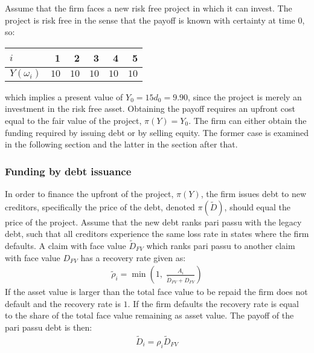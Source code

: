\documentclass[../main.tex]{subfiles}
\begin{document}
        Assume that the firm faces a new risk free project in which it can invest. The project is risk free in the sense that the payoff is known with certainty at time 0, so:
            \begin{table}[H]
                \centering
                \begin{tabular}{l|rrrrr}
                    $i$ & 1 & 2 & 3 & 4 & 5 \\
                    \hline
                    $Y(\omega_{i})$ & $10$ & $10$ & $10$ & $10$ & $10$
                \end{tabular}
            \end{table}
        which implies a present value of $Y_{0} = 15d_{0} = 9.90$, since the project is merely an investment in the risk free asset. Obtaining the payoff requires an upfront cost equal to the fair value of the project, $\pi(Y) = Y_{0}$. The firm can either obtain the funding required by issuing debt or by selling equity. The former case is examined in the following section and the latter in the section after that.

    \subsubsection{Funding by debt issuance}
        In order to finance the upfront of the project, $\pi(Y)$, the firm issues debt to new creditors, specifically the price of the debt, denoted $\pi(\tilde{D})$, should equal the price of the project. Assume that the new debt ranks pari passu with the legacy debt, such that all creditors experience the same loss rate in states where the firm defaults. A claim with face value $\tilde{D}_{FV}$ which ranks pari passu to another claim with face value $D_{FV}$ has a recovery rate given as:
            \begin{align}
                \tilde{\rho}_{i} = \min\left(
                    1,\;
                    \frac{A_{i}}{\tilde{D}_{FV} + D_{FV}}
                \right)
            \end{align}
        If the asset value is larger than the total face value to be repaid the firm does not default and the recovery rate is $1$. If the firm defaults the recovery rate is equal to the share of the total face value remaining as asset value. The payoff of the pari passu debt is then:
            \begin{align}
                \tilde{D}_{i}
                    = \rho_{i}\tilde{D}_{FV}
            \end{align}
\end{document}
